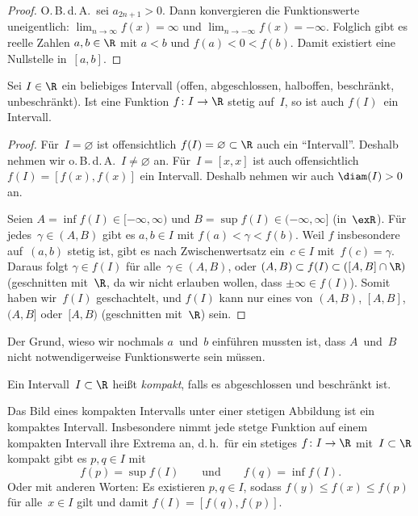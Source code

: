 \documentclass[a4paper]{article}
\begin{document}
\begin{proof}
    O.\,B.\,d.\,A.\ sei $a_{2n+1} > 0$. Dann konvergieren die Funktionswerte uneigentlich: $\lim_{n\to\infty} f(x) = \infty$ und $\lim_{n\to-\infty} f(x) = -\infty$. Folglich gibt es reelle Zahlen $a,b \in \R$ mit $a < b$ und $f(a) < 0 < f(b)$. Damit existiert eine Nullstelle in~$[a,b]$.
\end{proof}

\begin{corollary}\label{cor:continuity:interval}
    Sei $I \in \R$ ein beliebiges Intervall (offen, abgeschlossen, halboffen, beschränkt, unbeschränkt). Ist eine Funktion $f\colon I \to \R$ stetig auf~$I$, so ist auch $f(I)$~ein Intervall.
\end{corollary}

\begin{proof}
    Für~$I = \varnothing$ ist offensichtlich $f(I) = \varnothing \subset \R$ auch ein "`Intervall"'. Deshalb nehmen wir o.\,B.\,d.\,A.\ $I \neq \varnothing$ an. Für~$I = [x,x]$ ist auch offensichtlich $f(I) = [f(x),f(x)]$ ein Intervall. Deshalb nehmen wir auch $\diam(I) > 0$ an.

    Seien $A = \inf f(I) \in [-\infty,\infty)$ und $B = \sup f(I) \in (-\infty,\infty]$ (in~$\exR$). Für jedes~$\gamma \in (A,B)$ gibt es $a,b \in I$ mit $f(a) < \gamma < f(b)$. Weil $f$ insbesondere auf~$(a,b)$ stetig ist, gibt es nach Zwischenwertsatz ein~$c \in I$ mit~$f(c) = \gamma$. Daraus folgt $\gamma \in f(I)$ für alle~$\gamma \in (A,B)$, oder $(A,B) \subset f(I) \subset ([A,B] \cap \R)$ (geschnitten mit~$\R$, da wir nicht erlauben wollen, dass $\pm\infty \in f(I)$). Somit haben wir~$f(I)$ geschachtelt, und $f(I)$ kann nur eines von $(A,B)$, $[A,B]$, $(A,B]$ oder~$[A,B)$ (geschnitten mit~$\R$) sein.
\end{proof}

Der Grund, wieso wir nochmals $a$~und~$b$ einführen mussten ist, dass $A$~und~$B$ nicht notwendigerweise Funktionswerte sein müssen.

\begin{definition}
    Ein Intervall~$I \subset \R$ heißt \emph{kompakt}, falls es abgeschlossen und beschränkt ist.
\end{definition}

\begin{theorem}[Extremwertsatz]
    Das Bild eines kompakten Intervalls unter einer stetigen Abbildung ist ein kompaktes Intervall. Insbesondere nimmt jede stetge Funktion auf einem kompakten Intervall ihre Extrema an, d.\,h.\ für ein stetiges $f\colon I \to \R$ mit~$I \subset \R$ kompakt gibt es $p,q \in I$ mit
    \begin{equation*}
        f(p) = \sup f(I) \qquad\text{und}\qquad f(q) = \inf f(I).
    \end{equation*}
    Oder mit anderen Worten: Es existieren $p,q \in I$, sodass $f(y) \leq f(x) \leq f(p)$ für alle~$x \in I$ gilt und damit $f(I) = [f(q),f(p)]$.
\end{theorem}
\end{document}
